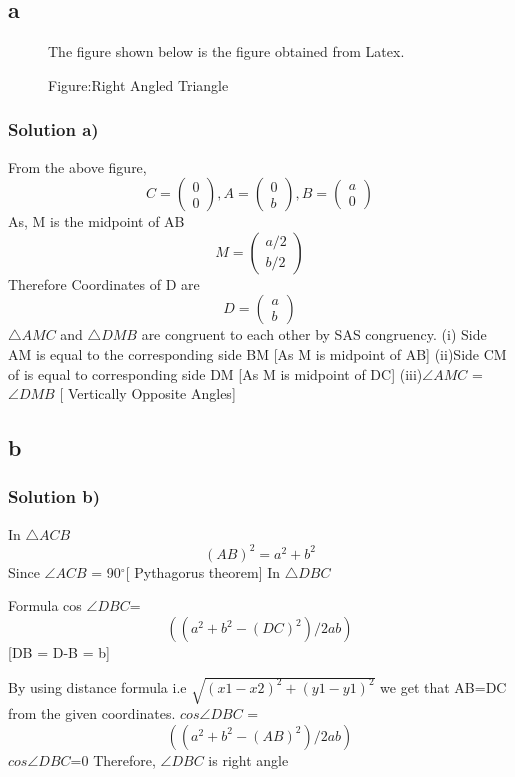 \documentclass{beamer}
\begin{document}
\subsection{a}
\begin{frame}
\begin{figure}
The figure shown below is the figure obtained from Latex.

\caption{Figure:Right Angled Triangle}
\end{figure}
\end{frame}
\begin{frame}
\frametitle{Solution a)}
\label{a}
\small
From the above figure,
$$
C=
\begin{pmatrix}
0\\
0
\end{pmatrix}
,A=
\begin{pmatrix}
0\\
b
\end{pmatrix}
,B=
\begin{pmatrix}
a\\
0
\end{pmatrix}
$$
As, M is the midpoint of AB
$$
M=
\begin{pmatrix}
a/2 \\
b/2 
\end{pmatrix}
$$
Therefore Coordinates of D are
$$
D=
\begin{pmatrix}
a\\
b
\end{pmatrix}
$$
\newline
$\triangle AMC$ and $\triangle DMB$ are congruent to each other by SAS congruency.
\newline
(i) Side AM  is equal to the corresponding side BM  [As M is midpoint of AB]
\newline
(ii)Side CM of is equal to corresponding side DM [As M is midpoint of DC]
\newline
(iii)$\angle AMC$ = $\angle DMB$ [ Vertically Opposite Angles]
\end{frame}
\subsection{b}
\begin{frame}
\frametitle{Solution b)}
\label{b}
\small
In $\triangle ACB$ \[(AB)^2=a^2+b^2\]
Since $\angle ACB$ = 90$^{\circ}$[ Pythagorus theorem]
\newline
In $\triangle DBC$ 
\begin{block}{Formula}
cos $\angle DBC$= \[((a^2+b^2-(DC)^2)/2ab)\] [DB = D-B = b]
\end{block}
By using distance formula i.e $\sqrt{(x1-x2)^2+(y1-y1)^2}$ we get that AB=DC from the given coordinates.
\newline
$cos\angle DBC$ =\[((a^2+b^2-(AB)^2)/2ab)\]
$cos\angle DBC$=0
\newline
Therefore, $\angle DBC$ is right angle
\end{frame}
\end{document}
